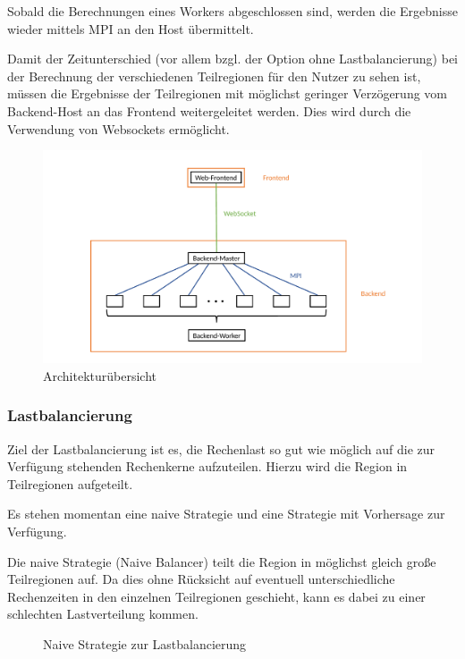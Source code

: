 Sobald die Berechnungen eines Workers abgeschlossen sind, werden die Ergebnisse wieder mittels MPI an den Host übermittelt.

Damit der Zeitunterschied (vor allem bzgl. der Option ohne Lastbalancierung) bei der Berechnung der verschiedenen Teilregionen für den Nutzer zu sehen ist, müssen die Ergebnisse der Teilregionen mit möglichst geringer Verzögerung vom Backend-Host an das Frontend weitergeleitet werden. Dies wird durch die Verwendung von Websockets ermöglicht.

\begin{figure}
    \centering
        \includegraphics[width=0.98\linewidth]{img/Implementierung/Kommunikation.pdf}
        \caption{Architekturübersicht}
    \label{fig:architekturuebersicht}
\end{figure}

\subsubsection{Lastbalancierung}

Ziel der Lastbalancierung ist es, die Rechenlast so gut wie möglich auf die zur Verfügung stehenden Rechenkerne aufzuteilen. Hierzu wird die Region in Teilregionen aufgeteilt.

Es stehen momentan eine naive Strategie und eine Strategie mit Vorhersage zur Verfügung.

Die naive Strategie (Naive Balancer) teilt die Region in möglichst gleich große Teilregionen auf. Da dies ohne Rücksicht auf eventuell unterschiedliche Rechenzeiten in den einzelnen Teilregionen geschieht, kann es dabei zu einer schlechten Lastverteilung kommen.

\begin{figure}
    \centering
        \caption{Naive Strategie zur Lastbalancierung}
    \label{fig:lastbalanceriung_naiv}
\end{figure}

